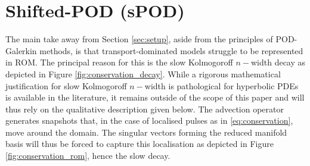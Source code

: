 \documentclass[../main.tex]{subfiles}
\begin{document}
\section{Shifted-POD (sPOD)}\label{sec:sPOD}

The main take away from Section \ref{sec:setup}, aside from the principles of POD-Galerkin methods, is that transport-dominated models struggle to be represented in ROM.
The principal reason for this is the slow Kolmogoroff $n-$width decay as depicted in Figure \ref{fig:conservation_decay}.
While a rigorous mathematical justification for slow Kolmogoroff $n-$width is pathological for hyperbolic PDEs is available in the literature, it remains outside of the scope of this paper and will thus rely on the qualitative description given below.
The advection operator generates snapshots that, in the case of localised pulses as in \eqref{eq:conservation}, move around the domain.
The singular vectors forming the reduced manifold basis will thus be forced to capture this localisation as depicted in Figure \ref{fig:conservation_rom}, hence the slow decay.


\end{document}
